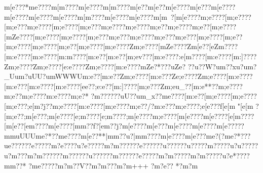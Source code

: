 {{{{{{{{{{{{{{{{{{{{{{{{{{{{{{{{{{{{{{{{{{{{{{{{{{{{{{{{{{{{{{{{{{{{{{{{{{{{{{{{{{{{{{{{{{{{{{{{{{{{{{{{{{{{{{{{{{{{{{{{{{{{{{{{{{{{{{{{{{{{{{{{{{{{{{{{{{{{{{{{{{{{{{{{{{{{{{{{{{{{{{{{{{{{{{{{{{{{{{{{{{{{{{{{{{{{{{{{{{{{{{{{{{{{{{{{{{{{{{{{{{{{{{{{{{{{{{{{{{{{{{{{{{{{{{{{{{{{{{{{{{{{{{{{{{{{{{{{{{{{{{{{{{{{{{{{{{{{{{{{{{{{{{{{{{{{{{{{{{{{{{{{{{{{{{{{{{{{{{{{{{{{{{{{{{{{{{{{{{{{{{{{{{{{{{{{{{{{{{{{{{{{{{{{{{{{{{{{{{{{{{{{{{{{{{{{{{{{{{{{{{{{{{{{{{{{{{{{{{{{{{{{{{{{{{{{{{{{{{{{{{{{{{{{{{{{{{{{{{{{{{{{{{{{{{{{{{{{{{{{{{{{{{{{{{{{{{{{{{{{{{{{{{{{{{{{{{{{{{{{{{{{{{{{{{{{{{{{{{{{{{{{{{{{{{{{{{{{{{{{{{{{{{{{{{{{{{{{{{{{{{{{{{{{{{{{{{{{{{{{{{{{{{{{{{{{{{{{{{{{{{{{{{{{{{{{{{{{{{{{{{{{{{{{{{{{{{{{{{{{{{{{{{{{{{{{{{{{{{{{{{{{{{{{{{{{{{{{{{{{{{{{{{{{{{{{{{{{{{{{{{{{{{{{{{{{{{{{{{{{{{{{{{{{{{{{{{{{{{{{{{{{{{{{{{{{{{{{{{{{{{{{{{{{{{{{{{{{{{{{{{{{{{{{{{{{{{{{{{{{{{{{{{{{{{{{{{{{{{{{{{{{{{{{{{{{{{{{{{{{{{{{{{{{{{{{{{{{{{{{{{{{{{{{{{{{{{{{{{{{{{{{{{{{{{{{{{{{{{{{{{{{{{{{{{{{{{{{{{{{{{{{{{{{{{{{{{{{{{{{{{{{{{{{{{{{{{{{{{{{{{{{{{m[e???*{m{e????{m[m????{m[e????{m[m????{m[e??{m[e??{m[e????{m[e???{m[e????{m[e????{m[e????{m[e????{m[m????{m[e????{m[e????{m[m~?[m[e????{m;e????[m;e????[m;e???{m;e????[m;e????[m;e???{m;e????{m;e????{m;e??{m;e????{m;e??[m;e????[mZe????[m;e????[m;e????[m;e???{m;e???{m;e????{m;e???{m;e???[m;e????[m;e??[m;e????[m;e????[m;e??[m;e????[m;e????Zm;e????[mZe????Zm[e??[eZm????[m:e????[m:e????[m:m????[m:e??[m:e??[m;ev???[m:e????:e[m????[m:e????[m:]????Zm;e????Zm;e????[e:e????Zm;e????[m:e????{mZe?*???uZe?
?}?u??W?u{m??xu?u{m?_U{u{m?uUU?u{mWWWU{m:e??[m:e??Zm;e????[m:e???Ze;e????Zm;e????[m:e????[m:e???[m:e????[m:e????[ee??;e:e??[m:]????[m;e???Zm;eu_??[m:e**??{m;e????{m;e??{m;e????{m:e????{m;e?*
?}{m?????}?uU??u{m_x? ?me????[m:e??[m;e????[m;e????[m;e???;e[m?j??{m;e????[m:e????[m;e????{m;e??/?{m:e???{m;e????;e[e???f[e[m "[e[m ?  [m;e??;m[e???;m[e????[e;m????[e;m????;m[e????{m;e????[m[e????{m[e????[e[m????[m[e??[e{m????{m[e????[m{m??f?[e{m??j?{m[e????{m[e???{m[e????{m[e????{m[e?????m{muUUU{m{e?*??{m{e????{m[e??**|m{m??u?|m{m????{m|e????{m|e???{m{e?( ?m{e?*???u{e?????}?e?????m?e ????u?e?????m?m?????}?e?????}?u?????}?u????}?m?????u?u?????u?m???m?m?????}?m?????}?u?????}?m?????}?e?????m?m?????m?m?????u?e*????m{m??*
?m{e?????m?m??V??m?m???m?m+++
?m?e??
*?m?m
}}}}}}}}}}}}}}}}}}}}}}}}}}}}}}}}}}}}}}}}}}}}}}}}}}}}}}}}}}}}}}}}}}}}}}}}}}}}}}}}}}}}}}}}}}}}}}}}}}}}}}}}}}}}}}}}}}}}}}}}}}}}}}}}}}}}}}}}}}}}}}}}}}}}}}}}}}}}}}}}}}}}}}}}}}}}}}}}}}}}}}}}}}}}}}}}}}}}}}}}}}}}}}}}}}}}}}}}}}}}}}}}}}}}}}}}}}}}}}}}}}}}}}}}}}}}}}}}}}}}}}}}}}}}}}}}}}}}}}}}}}}}}}}}}}}}}}}}}}}}}}}}}}}}}}}}}}}}}}}}}}}}}}}}}}}}}}}}}}}}}}}}}}}}}}}}}}}}}}}}}}}}}}}}}}}}}}}}}}}}}}}}}}}}}}}}}}}}}}}}}}}}}}}}}}}}}}}}}}}}}}}}}}}}}}}}}}}}}}}}}}}}}}}}}}}}}}}}}}}}}}}}}}}}}}}}}}}}}}}}}}}}}}}}}}}}}}}}}}}}}}}}}}}}}}}}}}}}}}}}}}}}}}}}}}}}}}}}}}}}}}}}}}}}}}}}}}}}}}}}}}}}}}}}}}}}}}}}}}}}}}}}}}}}}}}}}}}}}}}}}}}}}}}}}}}}}}}}}}}}}}}}}}}}}}}}}}}}}}}}}}}}}}}}}}}}}}}}}}}}}}}}}}}}}}}}}}}}}}}}}}}}}}}}}}}}}}}}}}}}}}}}}}}}}}}}}}}}}}}}}}}}}}}}}}}}}}}}}}}}}}}}}}}}}}}}}}}}}}}}}}}}}}}}}}}}}}}}}}}}}}}}}}}}}}}}}}}}}}}}}}}}}}}}}}}}}}}}}}}}}}}}}}}}}}}}}}}}}}}}}}}}}}}}}}}}}}}}}}}}}}}}}}}}}}}}}}}}}}}}}}}}}}}}}}}}}}}}}}}}}}}}}}}}}}}}}}}}}}}}}}}}}}}}}}}}}}}}}}}}}}}}}}}}}}}}}}}}}}}}}}}}}}}}}}}}}}}}}}}}}}}}}}}}}}}}}}}}}}}}}}}}}}}}}}}}}}}}}}}}}}}}}}}}}}}}}}}}}}}}}}}}}}}}}}}}}}}}}}}}}}}}}}}}}}}}}}}}}}}}}}}}}}}
